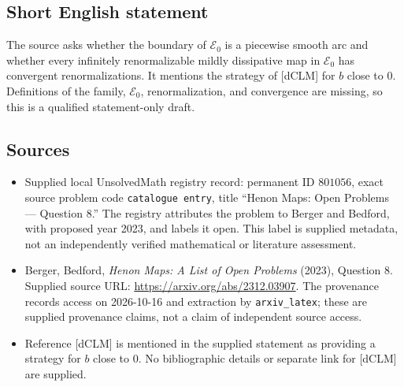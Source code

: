 \documentclass[11pt]{article}
\begin{document}
\subsection{Short English statement}
The source asks whether the boundary of $\mathcal E_0$ is a piecewise smooth arc and whether every infinitely renormalizable mildly dissipative map in $\mathcal E_0$ has convergent renormalizations. It mentions the strategy of [dCLM] for $b$ close to $0$. Definitions of the family, $\mathcal E_0$, renormalization, and convergence are missing, so this is a qualified statement-only draft.
\subsection{Sources}
\begin{itemize}
\item Supplied local UnsolvedMath registry record: permanent ID $801056$, exact source problem code \texttt{catalogue entry}, title ``Henon Maps: Open Problems --- Question 8.'' The registry attributes the problem to Berger and Bedford, with proposed year 2023, and labels it open. This label is supplied metadata, not an independently verified mathematical or literature assessment.
\item Berger, Bedford, \emph{Henon Maps: A List of Open Problems} (2023), Question 8. Supplied source URL: \url{https://arxiv.org/abs/2312.03907}. The provenance records access on 2026-10-16 and extraction by \texttt{arxiv\_latex}; these are supplied provenance claims, not a claim of independent source access.
\item Reference [dCLM] is mentioned in the supplied statement as providing a strategy for $b$ close to $0$. No bibliographic details or separate link for [dCLM] are supplied.
\end{itemize}
\end{document}

